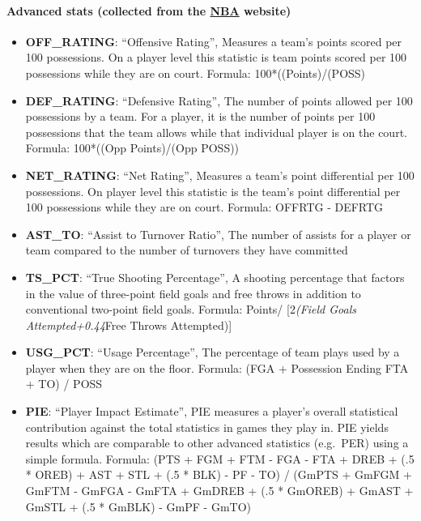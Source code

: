 \documentclass[
]{article}
\providecommand{\tightlist}{%
  \setlength{\itemsep}{0pt}\setlength{\parskip}{0pt}}
\begin{document}
\hypertarget{advanced-stats-collected-from-the-nba-website}{%
\paragraph{\texorpdfstring{Advanced stats (collected from the
\href{https://www.nba.com/?47}{NBA}
website)}{Advanced stats (collected from the NBA website)}}\label{advanced-stats-collected-from-the-nba-website}}

\begin{itemize}
\tightlist
\item
  \textbf{OFF\_RATING}: ``Offensive Rating'', Measures a team's points
  scored per 100 possessions. On a player level this statistic is team
  points scored per 100 possessions while they are on court. Formula:
  100*((Points)/(POSS)
\item
  \textbf{DEF\_RATING}: ``Defensive Rating'', The number of points
  allowed per 100 possessions by a team. For a player, it is the number
  of points per 100 possessions that the team allows while that
  individual player is on the court. Formula: 100*((Opp Points)/(Opp
  POSS))
\item
  \textbf{NET\_RATING}: ``Net Rating'', Measures a team's point
  differential per 100 possessions. On player level this statistic is
  the team's point differential per 100 possessions while they are on
  court. Formula: OFFRTG - DEFRTG
\item
  \textbf{AST\_TO}: ``Assist to Turnover Ratio'', The number of assists
  for a player or team compared to the number of turnovers they have
  committed
\item
  \textbf{TS\_PCT}: ``True Shooting Percentage'', A shooting percentage
  that factors in the value of three-point field goals and free throws
  in addition to conventional two-point field goals. Formula: Points/
  {[}2\emph{(Field Goals Attempted+0.44}Free Throws Attempted){]}
\item
  \textbf{USG\_PCT}: ``Usage Percentage'', The percentage of team plays
  used by a player when they are on the floor. Formula: (FGA +
  Possession Ending FTA + TO) / POSS
\item
  \textbf{PIE}: ``Player Impact Estimate'', PIE measures a player's
  overall statistical contribution against the total statistics in games
  they play in. PIE yields results which are comparable to other
  advanced statistics (e.g.~PER) using a simple formula. Formula: (PTS +
  FGM + FTM - FGA - FTA + DREB + (.5 * OREB) + AST + STL + (.5 * BLK) -
  PF - TO) / (GmPTS + GmFGM + GmFTM - GmFGA - GmFTA + GmDREB + (.5 *
  GmOREB) + GmAST + GmSTL + (.5 * GmBLK) - GmPF - GmTO)
\end{itemize}
\end{document}
